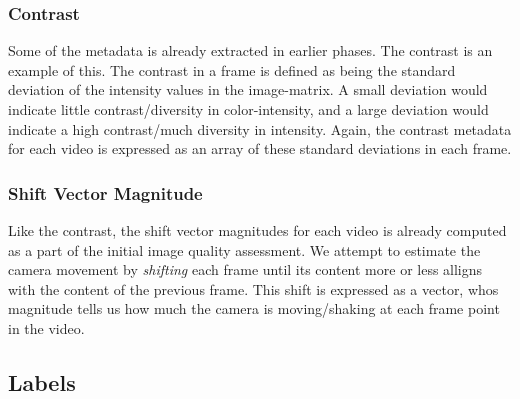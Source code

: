 \subsubsection{Contrast}
%
Some of the metadata is already extracted in earlier phases. The contrast is an example of this. The contrast in a frame is defined as being the standard deviation of the intensity values in the image-matrix. A small deviation would indicate little contrast/diversity in color-intensity, and a large deviation would indicate a high contrast/much diversity in intensity. Again, the contrast metadata for each video is expressed as an array of these standard deviations in each frame.
%
\subsubsection{Shift Vector Magnitude}
%
Like the contrast, the shift vector magnitudes for each video is already computed as a part of the initial image quality assessment. We attempt to estimate the camera movement by \textit{shifting} each frame until its content more or less alligns with the content of the previous frame. This shift is expressed as a vector, whos magnitude tells us how much the camera is moving/shaking at each frame point in the video.
%
\subsection{Labels}
%

%
